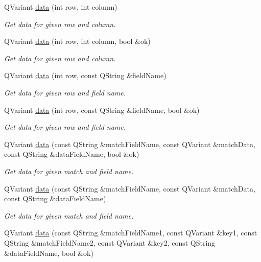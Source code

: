 \begin{DoxyCompactItemize}
Q\-Variant \hyperlink{classmdt_abstract_sql_table_controller_af1d1cc870f914ee8278884a118325fba}{data} (int row, int column)
\begin{DoxyCompactList}\small\item\em Get data for given row and column. \end{DoxyCompactList}\item 
Q\-Variant \hyperlink{classmdt_abstract_sql_table_controller_a09ac7fcd64c6d75ebbbd15ab30957674}{data} (int row, int column, bool \&ok)
\begin{DoxyCompactList}\small\item\em Get data for given row and column. \end{DoxyCompactList}\item 
Q\-Variant \hyperlink{classmdt_abstract_sql_table_controller_a83e15b11cdbdd9455049454dca6d4331}{data} (int row, const Q\-String \&field\-Name)
\begin{DoxyCompactList}\small\item\em Get data for given row and field name. \end{DoxyCompactList}\item 
Q\-Variant \hyperlink{classmdt_abstract_sql_table_controller_a99a52795749a325b8b96096cffe60866}{data} (int row, const Q\-String \&field\-Name, bool \&ok)
\begin{DoxyCompactList}\small\item\em Get data for given row and field name. \end{DoxyCompactList}\item 
Q\-Variant \hyperlink{classmdt_abstract_sql_table_controller_a40af55ec0b11a0a81f748662c912b761}{data} (const Q\-String \&match\-Field\-Name, const Q\-Variant \&match\-Data, const Q\-String \&data\-Field\-Name, bool \&ok)
\begin{DoxyCompactList}\small\item\em Get data for given match and field name. \end{DoxyCompactList}\item 
Q\-Variant \hyperlink{classmdt_abstract_sql_table_controller_a497441f3486c77cc832181fe34bd6492}{data} (const Q\-String \&match\-Field\-Name, const Q\-Variant \&match\-Data, const Q\-String \&data\-Field\-Name)
\begin{DoxyCompactList}\small\item\em Get data for given match and field name. \end{DoxyCompactList}\item 
Q\-Variant \hyperlink{classmdt_abstract_sql_table_controller_aa79313d4ac1fbdd86b90ad9d1c0121f9}{data} (const Q\-String \&match\-Field\-Name1, const Q\-Variant \&key1, const Q\-String \&match\-Field\-Name2, const Q\-Variant \&key2, const Q\-String \&data\-Field\-Name, bool \&ok)

\end{DoxyCompactItemize}
